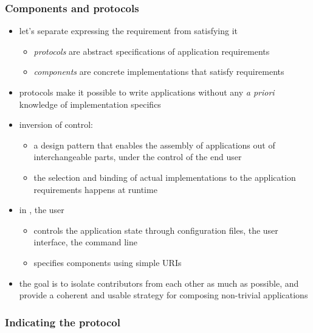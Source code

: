 \begin{frame}
%
  \frametitle{Components and protocols}
%
  \begin{itemize}
%
  \item let's separate expressing the requirement from satisfying it
      \begin{itemize}
      \item \emph{protocols} are abstract specifications of application requirements
      \item \emph{components} are concrete implementations that satisfy requirements
      \end{itemize}
%
    \item protocols make it possible to write applications without any \emph{a priori} knowledge
      of implementation specifics
%
    \item inversion of control\supercite{johnson-88}:
      \begin{itemize}
      \item a design pattern\supercite{patterns} that enables the assembly of applications out
        of interchangeable parts, under the control of the end user
      \item the selection and binding of actual implementations to the application requirements
        happens at runtime
      \end{itemize}
%
    \item in \pyre, the user
      \begin{itemize}
      \item controls the application state through configuration files, the user interface, the
        command line
      \item specifies components using simple URIs
      \end{itemize}
%
    \item the goal is to isolate contributors from each other as much as possible, and provide
      a coherent and usable strategy for composing non-trivial applications
%
  \end{itemize}
%
\end{frame}

\begin{frame}
%
  \frametitle{Indicating the protocol}
%
%
\end{frame}

